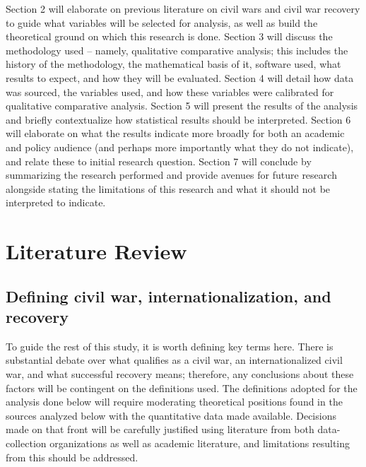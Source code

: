 \documentclass{article}
\begin{document}
Section 2 will elaborate on previous literature on civil wars and civil war recovery to guide what variables will be selected for analysis, as well as build the theoretical ground on which this research is done. Section 3 will discuss the methodology used -- namely, qualitative comparative analysis; this includes the history of the methodology, the mathematical basis of it, software used, what results to expect, and how they will be evaluated. Section 4 will detail how data was sourced, the variables used, and how these variables were calibrated for qualitative comparative analysis. Section 5 will present the results of the analysis and briefly contextualize how statistical results should be interpreted. Section 6 will elaborate on what the results indicate more broadly for both an academic and policy audience (and perhaps more importantly what they do not indicate), and relate these to initial research question. Section 7 will conclude by summarizing the research performed and provide avenues for future research alongside stating the limitations of this research and what it should not be interpreted to indicate.


\section{Literature Review}
\subsection{Defining civil war, internationalization, and recovery}
To guide the rest of this study, it is worth defining key terms here. There is substantial debate over what qualifies as a civil war, an internationalized civil war, and what successful recovery means; therefore, any conclusions about these factors will be contingent on the definitions used. The definitions adopted for the analysis done below will require moderating theoretical positions found in the sources analyzed below with the quantitative data made available. Decisions made on that front will be carefully justified using literature from both data-collection organizations as well as academic literature, and limitations resulting from this should be addressed.
\end{document}
